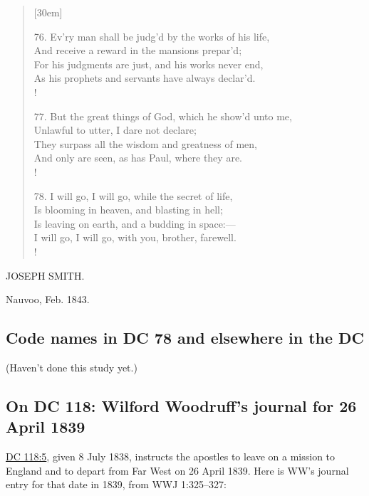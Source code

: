 \begin{verse}[30em]
\begin{altverse}
				76. Ev'ry man shall be judg'd by the works of his life, \\ 
				And receive a reward in the mansions prepar'd; \\ 
				For his judgments are just, and his works never end, \\ 
				As his prophets and servants have always declar'd. \\!
				 
				77. But the great things of God, which he show'd unto me, \\ 
				Unlawful to utter, I dare not declare; \\ 
				They surpass all the wisdom and greatness of men, \\ 
				And only are seen, as has Paul, where they are. \\!
				 
				78. I will go, I will go, while the secret of life, \\ 
				Is blooming in heaven, and blasting in hell; \\ 
				Is leaving on earth, and a budding in space:--- \\ 
				I will go, I will go, with you, brother, farewell. \\!
				
			\end{altverse}
			
			\end{verse}
				
			\begin{tightright}
				JOSEPH SMITH.
			\end{tightright}
				
			Nauvoo, Feb. 1843.
				
	\subsection{Code names in DC 78 and elsewhere in the DC}
		\label{EXSS-DC78-CODENAMES}
		
		(Haven't done this study yet.)
		
	\subsection{On DC 118: Wilford Woodruff's journal for 26 April 1839}
		\label{EXSS-DC118-WWJ}
		
		\hyperref[DC118:5]{DC 118:5}, given 8 July 1838, instructs the apostles to leave on a mission to England and to depart from Far West on 26 April 1839. Here is WW's journal entry for that date in 1839, from WWJ 1:325--327:
		
